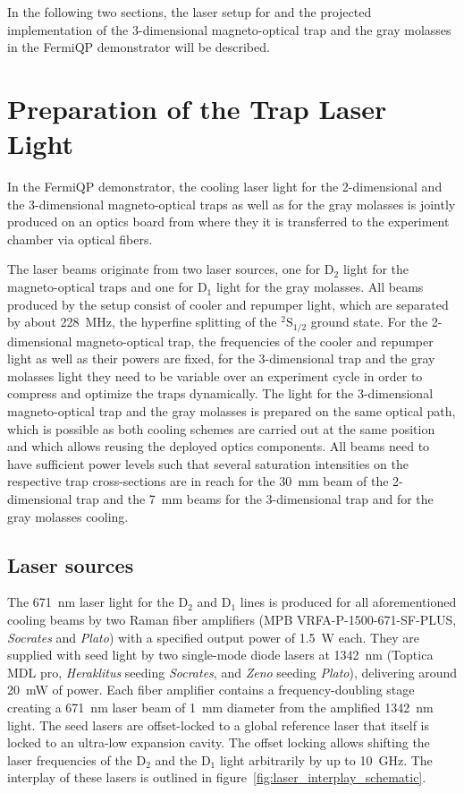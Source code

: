 In the following two sections, the laser setup for and the projected implementation of the 3-dimensional magneto-optical trap and the gray molasses in the FermiQP demonstrator will be described.


\section{Preparation of the Trap Laser Light}\label{ch:light_preparation}
In the FermiQP demonstrator, the cooling laser light for the 2-dimensional and the 3-dimensional magneto-optical traps as well as for the gray molasses is jointly produced on an optics board from where they it is transferred to the experiment chamber via optical fibers.

The laser beams originate from two laser sources, one for D$_2$ light for the magneto-optical traps and one for D$_1$ light for the gray molasses. All beams produced by the setup consist of cooler and repumper light, which are separated by about \SI{228}{\mega\hertz}, the hyperfine splitting of the $^2\text{S}_{1/2}$ ground state. For the 2-dimensional magneto-optical trap, the frequencies of the cooler and repumper light as well as their powers are fixed, for the 3-dimensional trap and the gray molasses light they need to be variable over an experiment cycle in order to compress and optimize the traps dynamically. The light for the 3-dimensional magneto-optical trap and the gray molasses is prepared on the same optical path, which is possible as both cooling schemes are carried out at the same position and which allows reusing the deployed optics components. All beams need to have sufficient power levels such that several saturation intensities on the respective trap cross-sections are in reach for the \SI{30}{\milli\meter} beam of the 2-dimensional trap and the \SI{7}{\milli\meter} beams for the 3-dimensional trap  and for the gray molasses cooling.

\subsection*{Laser sources}
The \SI{671}{\nano\meter} laser light for the D$_2$ and D$_1$ lines is produced for all aforementioned cooling beams by two Raman fiber amplifiers (MPB VRFA-P-1500-671-SF-PLUS, \textit{Socrates} and \textit{Plato}) with a specified output power of \SI{1.5}{\watt} each. They are supplied with seed light by two single-mode diode lasers at \SI{1342}{\nano\meter} (Toptica MDL pro, \textit{Heraklitus} seeding \textit{Socrates}, and \textit{Zeno} seeding \textit{Plato}), delivering around \SI{20}{\milli\watt} of power. Each fiber amplifier contains a frequency-doubling stage creating a \SI{671}{\nano\meter} laser beam of \SI{1}{\milli\meter} diameter from the amplified \SI{1342}{\nano\meter} light. The seed lasers are offset-locked to a global reference laser that itself is locked to an ultra-low expansion cavity. The offset locking allows shifting the laser frequencies of the D$_2$ and the D$_1$ light arbitrarily by up to \SI[]{10}{\giga\hertz}. The interplay of these lasers is outlined in figure~\ref{fig:laser_interplay_schematic}.

